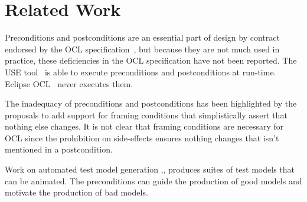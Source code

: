 \documentclass[
]{ceurart}
\begin{document}


\section{Related Work}\label{Related Work}

Preconditions and postconditions are an essential part of design by contract endorsed by the OCL specification~\cite{OCL-2.4}, but because they are not much used in practice, these deficiencies in the OCL specification have not been reported. The USE tool~\cite{USE} is able to execute preconditions and postconditions at run-time. Eclipse OCL~\cite{Eclipse-OCL} never executes them.

The inadequacy of preconditions and postconditions has been highlighted by the proposals to add support for framing conditions \cite{Framing} that simplistically assert that nothing else changes. It is not clear that framing conditions are necessary for OCL since the prohibition on side-effects ensures nothing changes that isn't mentioned in a postcondition.  

Work on automated test model generation \cite{Brucker},\cite{Francisco},\cite{Gogolla} produces suites of test models that can be animated. The preconditions can guide the production of good models and motivate the production of bad models.
\end{document}
